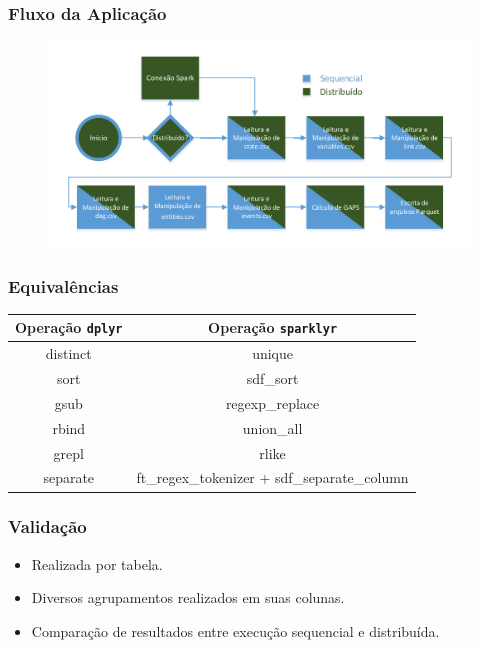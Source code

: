 \documentclass{beamer}
\begin{document}
\begin{frame}
 \frametitle{Fluxo da Aplicação}
 \begin{figure}[H]
 \centerline{\includegraphics[width=1\textwidth]{./img/applicationflow.pdf}}
 \label{fig:spark-starvz-flow}
 \end{figure}
\end{frame}

\begin{frame}
 \frametitle{Equivalências}
 \begin{table}[H]
  \centering
  \small
  \begin{tabular}{c c} \toprule
  \textbf{Operação \texttt{dplyr}}  &  \textbf{Operação \texttt{sparklyr}}\\ 
  \midrule
  distinct	& unique  \\
  sort		& sdf\_sort \\
  gsub		& regexp\_replace\\
  rbind		& union\_all\\
  grepl		& rlike\\
  separate	& ft\_regex\_tokenizer + sdf\_separate\_column       \\
  \end{tabular}
  \label{tab:equivalence}
  \end{table}
\end{frame}

\begin{frame}
 \frametitle{Validação}
 \begin{itemize}
  \item Realizada por tabela.
  \item Diversos agrupamentos realizados em suas colunas.
  \item Comparação de resultados entre execução sequencial e distribuída.
 \end{itemize}
\end{frame}
\end{document}
